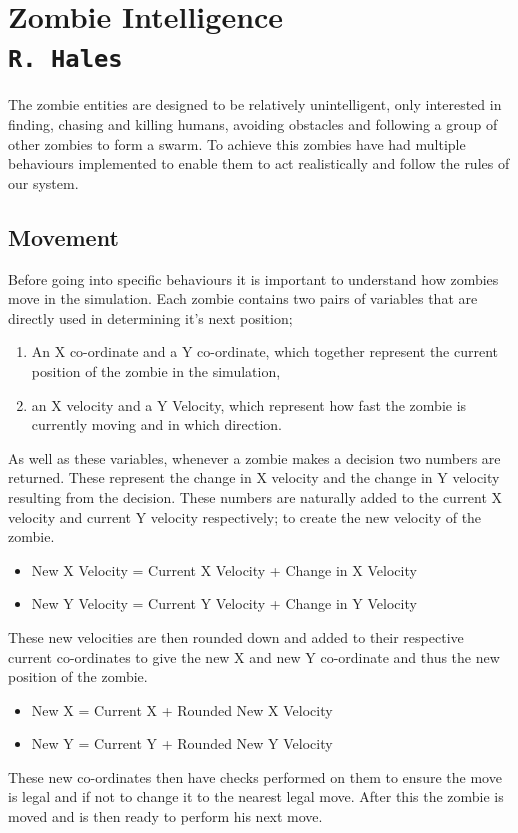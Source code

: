 \pagestyle{empty}
\section{Zombie Intelligence\\{\small\tt{R.~Hales}}}
\label{zombie_doc}
The zombie entities are designed to be relatively unintelligent, only interested in finding, chasing and killing humans, avoiding obstacles and following a group of other zombies to form a swarm. To achieve this zombies have had multiple behaviours implemented to enable them to act realistically and follow the rules of our system.
\subsection{Movement}
\label{movement}
Before going into specific behaviours it is important to understand how zombies move in the simulation. Each zombie contains two pairs of variables that are directly used in determining it's next position; \begin{enumerate}\item{An X co-ordinate and a Y co-ordinate, which together represent the current position of the zombie in the simulation,}\item{an X velocity and a Y Velocity, which represent how fast the zombie is currently moving and in which direction.}\end{enumerate}
As well as these variables, whenever a zombie makes a decision two numbers are returned. These represent the change in X velocity and the change in Y velocity resulting from the decision. These numbers are naturally added to the current X velocity and current Y velocity respectively; to create the new velocity of the zombie.
\begin{itemize}\item{New X Velocity = Current X Velocity + Change in X Velocity}
\item{New Y Velocity = Current Y Velocity + Change in Y Velocity}
\end{itemize}
These new velocities are then rounded down and added to their respective current co-ordinates to give the new X and new Y co-ordinate and thus the new position of the zombie.
\begin{itemize}\item{New X = Current X + Rounded New X Velocity}
\item{New Y = Current Y + Rounded New Y Velocity}
\end{itemize}
These new co-ordinates then have checks performed on them to ensure the move is legal and if not to change it to the nearest legal move. After this the zombie is moved and is then ready to perform his next move.
